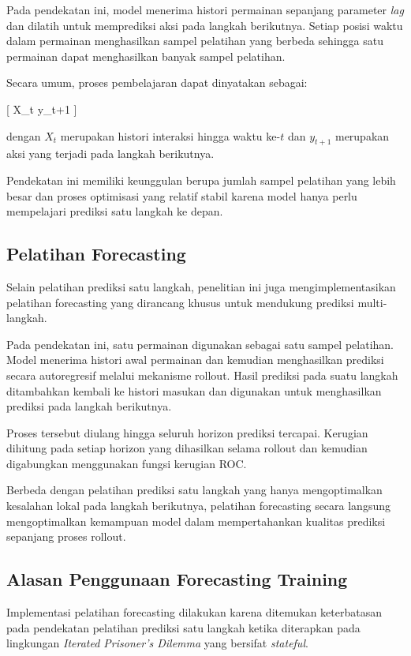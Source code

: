 Pada pendekatan ini, model menerima histori permainan sepanjang parameter \textit{lag} dan dilatih untuk memprediksi aksi pada langkah berikutnya. Setiap posisi waktu dalam permainan menghasilkan sampel pelatihan yang berbeda sehingga satu permainan dapat menghasilkan banyak sampel pelatihan.

Secara umum, proses pembelajaran dapat dinyatakan sebagai:

[
X_t \rightarrow y_{t+1}
]

dengan $X_t$ merupakan histori interaksi hingga waktu ke-$t$ dan $y_{t+1}$ merupakan aksi yang terjadi pada langkah berikutnya.

Pendekatan ini memiliki keunggulan berupa jumlah sampel pelatihan yang lebih besar dan proses optimisasi yang relatif stabil karena model hanya perlu mempelajari prediksi satu langkah ke depan.

\subsection{Pelatihan Forecasting}

Selain pelatihan prediksi satu langkah, penelitian ini juga mengimplementasikan pelatihan forecasting yang dirancang khusus untuk mendukung prediksi multi-langkah.

Pada pendekatan ini, satu permainan digunakan sebagai satu sampel pelatihan. Model menerima histori awal permainan dan kemudian menghasilkan prediksi secara autoregresif melalui mekanisme rollout. Hasil prediksi pada suatu langkah ditambahkan kembali ke histori masukan dan digunakan untuk menghasilkan prediksi pada langkah berikutnya.

Proses tersebut diulang hingga seluruh horizon prediksi tercapai. Kerugian dihitung pada setiap horizon yang dihasilkan selama rollout dan kemudian digabungkan menggunakan fungsi kerugian ROC.

Berbeda dengan pelatihan prediksi satu langkah yang hanya mengoptimalkan kesalahan lokal pada langkah berikutnya, pelatihan forecasting secara langsung mengoptimalkan kemampuan model dalam mempertahankan kualitas prediksi sepanjang proses rollout.

\subsection{Alasan Penggunaan Forecasting Training}

Implementasi pelatihan forecasting dilakukan karena ditemukan keterbatasan pada pendekatan pelatihan prediksi satu langkah ketika diterapkan pada lingkungan \textit{Iterated Prisoner's Dilemma} yang bersifat \textit{stateful}.

